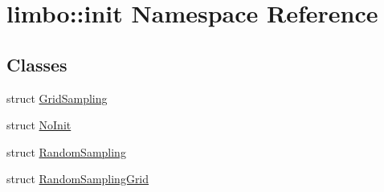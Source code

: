 \hypertarget{namespacelimbo_1_1init}{}\section{limbo\+:\+:init Namespace Reference}
\label{namespacelimbo_1_1init}
\subsection*{Classes}
\begin{DoxyCompactItemize}
\item 
struct \hyperlink{structlimbo_1_1init_1_1_grid_sampling}{Grid\+Sampling}
\item 
struct \hyperlink{structlimbo_1_1init_1_1_no_init}{No\+Init}
\item 
struct \hyperlink{structlimbo_1_1init_1_1_random_sampling}{Random\+Sampling}
\item 
struct \hyperlink{structlimbo_1_1init_1_1_random_sampling_grid}{Random\+Sampling\+Grid}
\end{DoxyCompactItemize}
